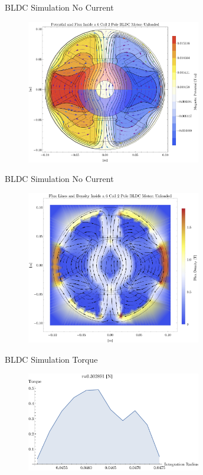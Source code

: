 \documentclass{beamer}
\begin{document}
    \begin{frame}{BLDC Simulation}
        No Current
        \begin{figure}
            \centering
            \includegraphics[width=3in]{potential-unloaded-6coils.pdf}
            \label{fig:my_label}
        \end{figure}
    \end{frame}
    
    \begin{frame}{BLDC Simulation}
        No Current
        \begin{figure}
            \centering
            \includegraphics[width=3in]{flux-unloaded-6coils.jpg}
            \label{fig:my_label}
        \end{figure}
    \end{frame}
    
    \begin{frame}{BLDC Simulation}
        Torque
        \begin{figure}
            \centering
            \includegraphics[width=3in]{torque-unloaded.pdf}
            \label{fig:my_label}
        \end{figure}
    \end{frame}
    
\end{document}
